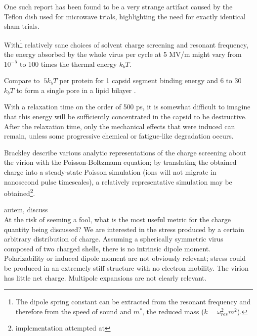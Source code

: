 \documentclass[paper.tex]{subfiles}
\begin{document}
\begin{multicols}{1}
One such report has been found to be a very strange artifact caused by the Teflon dish used for microwave trials\cite{Effect1994a}, highlighting the need for exactly identical sham trials.


With\footnote{The dipole spring constant can be extracted from the resonant frequency and therefore from the speed of sound and $m^*$, the reduced mass ($k = \omega_{res}^2 m^2$). } relatively sane choices of solvent charge screening and resonant frequency, the energy absorbed by the whole virus per cycle at 5 MV/m might vary from $10^{-5}$ to 100 times the thermal energy $k_b T$.

Compare to $~5 k_b T$ per protein for 1 capsid segment binding energy \cite{Energies2012} \cite{Weak2002} and 6 to 30 $k_b T$ to form a single pore in a lipid bilayer \cite{Atomistic2014}. 

With a relaxation time on the order of 500 ps, it is somewhat difficult to imagine that this energy will be sufficiently concentrated in the capsid to be destructive. After the relaxation time, only the mechanical effects that were induced can remain, unless some progressive chemical or fatigue-like degradation occurs.


Brackley \cite{Electrostatic2020} describe various analytic representations of the charge screening about the virion with the Poisson-Boltzmann equation; by translating the obtained charge into a steady-state Poisson simulation (ions will not migrate in nanosecond pulse timescales), a relatively representative simulation may be obtained\footnote{implementation attempted at }.

\end{multicols}
\begin{autem}
	autem, discuss\\
	At the risk of seeming a fool, what is the most useful metric for the charge quantity being discussed? We are interested in the stress produced by a certain arbitrary distribution of charge. Assuming a spherically symmetric virus composed of two charged shells, there is no intrinsic dipole moment. Polarizability or induced dipole moment are not obviously relevant; stress could be produced in an extremely stiff structure with no electron mobility. The virion has little net charge. Multipole expansions are not clearly relevant.
\end{autem}
\end{document}
